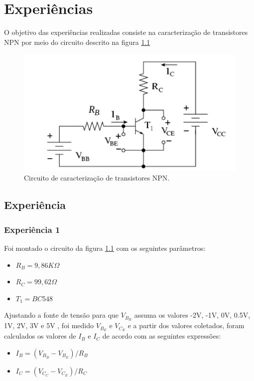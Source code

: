 \documentclass{abntex2}
\begin{document}
\imprimircapa
\imprimirfolhaderosto

\tableofcontents
\listoffigures
\clearpage

\chapter{Experiências}

 O objetivo das experiências realizadas consiste na caracterização de transistores NPN
 por meio do circuito descrito na figura
 \ref{fig:circuito}

\begin{figure}[h]
  \centering
  \includegraphics[scale = 0.5]{circuito.png}
  \caption{Circuito de caracterização de transistores NPN.}
  \label{fig:circuito}
\end{figure}


\section{Experiência}
\subsection{Experiência 1}

Foi montado o circuito da figura \ref{fig:circuito} com os seguintes parâmetros:
\begin{itemize}
  \item $R_B = 9,86K\Omega $
  \item $R_C = 99,62\Omega$
  \item $T_1 = BC548$
\end{itemize}

Ajustando a fonte de tensão para que $V_B_B$ assuma os valores -2V, -1V, 0V, 0.5V, 1V, 2V, 3V e 5V
, foi medido $V_B_E$ e $V_C_E$ e a partir dos valores coletados, foram calculados os valores de $I_B$ e $I_C$ de acordo com as seguintes expressões:
\begin{itemize}
  \item $I_B = (V_B_B - V_B_E) / R_B$
  \item $I_C = (V_C_C - V_C_E) / R_C$
\end{itemize}
\end{document}
